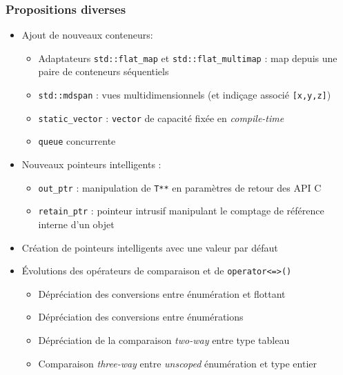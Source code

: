 \documentclass[C++.tex]{subfiles}
\begin{document}
\begin{frame}[fragile]
	\frametitle{Propositions diverses}
	\begin{itemize}
		\item Ajout de nouveaux \og conteneurs\fg{}:
		\begin{itemize}
			\item Adaptateurs \lstinline|std::flat_map| et \lstinline|std::flat_multimap| : map depuis une paire de conteneurs séquentiels
			\item \lstinline|std::mdspan| : vues multidimensionnels (et indiçage associé \lstinline|[x,y,z]|)


			\item \lstinline|static_vector| : \lstinline|vector| de capacité fixée en \textit{compile-time}


			\item \lstinline|queue| concurrente
		\end{itemize}

		\item Nouveaux pointeurs intelligents :
		\begin{itemize}
			\item \lstinline|out_ptr| : manipulation de \lstinline|T**| en paramètres de retour des API C
			\item \lstinline|retain_ptr| : pointeur intrusif manipulant le comptage de référence interne d'un objet
		\end{itemize}
		\item Création de pointeurs intelligents avec une valeur par défaut
		\item Évolutions des opérateurs de comparaison et de \lstinline|operator<=>()|
		\begin{itemize}
			\item Dépréciation des conversions entre énumération et flottant
			\item Dépréciation des conversions entre énumérations
			\item Dépréciation de la comparaison \og \textit{two-way}\fg{} entre type tableau
			\item Comparaison \og \textit{three-way}\fg{} entre \textit{unscoped} énumération et type entier


		\end{itemize}
	\end{itemize}
\end{frame}
\end{document}
